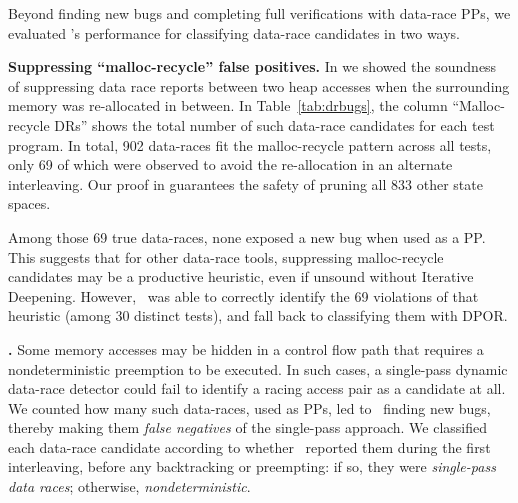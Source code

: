 Beyond finding new bugs and completing full verifications with data-race PPs, we evaluated \quicksand's performance for classifying data-race candidates in two ways.

{\bf Suppressing ``malloc-recycle'' false positives.}
In \sect{\ref{sec:recycle}} we showed the soundness of suppressing data race reports between two heap accesses when the surrounding memory was re-allocated in between.
In Table~\ref{tab:drbugs}, the column ``Malloc-recycle DRs'' shows the total number of such data-race candidates for each test program.
In total, 902 data-races fit the malloc-recycle pattern across all tests,
only 69 of which were observed to avoid the re-allocation in an alternate interleaving.
Our proof in \sect{\ref{sec:recycle}} guarantees the safety of pruning all 833 other state spaces.

Among those 69 true data-races, %
none exposed a new bug when used as a PP.
This suggests that for other data-race tools,
suppressing malloc-recycle candidates may be a productive heuristic,
even if unsound without Iterative Deepening.
However, \quicksand~was able to correctly identify the 69 violations of that heuristic (among 30 distinct tests),
and fall back to classifying them with DPOR.


{\bf {}.}
Some memory accesses may be hidden in a control flow path that requires a nondeterministic preemption to be executed.
In such cases, a single-pass dynamic data-race detector
could fail
to identify a racing access pair as a candidate at all. %
%
We counted how many such data-races, used as PPs, led to \quicksand~finding new bugs,
thereby making them {\em false negatives} of the single-pass approach.
We classified each data-race candidate according to whether \landslide~reported them during the first interleaving,
before any backtracking or preempting:
if so, they were {\em single-pass data races}; otherwise, {\em nondeterministic}.

